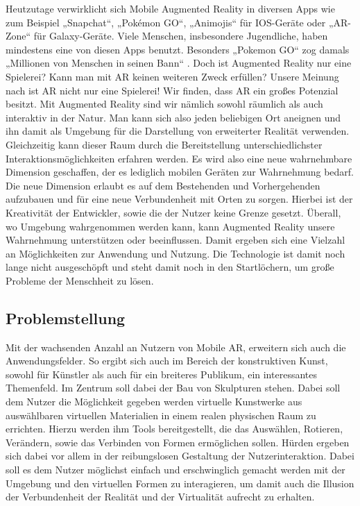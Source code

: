 \documentclass[12pt,a4paper, oneside]{scrartcl}
\begin{document}
	
Heutzutage verwirklicht sich Mobile Augmented Reality in diversen Apps wie zum Beispiel „Snapchat“, „Pokémon GO“, „Animojis“ für IOS-Geräte oder „AR-Zone“ für Galaxy-Geräte. Viele Menschen, insbesondere Jugendliche, haben mindestens eine von diesen Apps benutzt. Besonders „Pokemon GO“ zog damals „Millionen von Menschen in seinen Bann“ \cite{tobien_2016}.  
Doch ist Augmented Reality nur eine Spielerei? Kann man mit AR keinen weiteren Zweck erfüllen?
Unsere Meinung nach ist AR nicht nur eine Spielerei! Wir finden, dass AR ein großes Potenzial besitzt. Mit Augmented Reality sind wir nämlich sowohl räumlich als auch interaktiv in der Natur. Man kann sich also jeden beliebigen Ort aneignen und ihn damit als  Umgebung für die Darstellung von erweiterter Realität verwenden. Gleichzeitig kann dieser Raum durch die Bereitstellung unterschiedlichster Interaktionsmöglichkeiten erfahren werden. Es wird also eine neue wahrnehmbare Dimension geschaffen, der es lediglich mobilen Geräten zur Wahrnehmung bedarf. Die neue Dimension erlaubt es auf dem Bestehenden und Vorhergehenden aufzubauen und für eine neue Verbundenheit mit Orten zu sorgen.
Hierbei ist der Kreativität der Entwickler, sowie die der Nutzer keine Grenze gesetzt. Überall, wo Umgebung wahrgenommen werden kann, kann Augmented Reality unsere Wahrnehmung unterstützen oder beeinflussen.
Damit ergeben sich eine Vielzahl an Möglichkeiten zur Anwendung und Nutzung. Die Technologie ist damit noch lange nicht ausgeschöpft und steht damit noch in den Startlöchern, um große Probleme der Menschheit zu lösen.




\newpage
	
	
	
\subsection{Problemstellung}

Mit der wachsenden Anzahl an Nutzern von Mobile AR, erweitern sich auch die Anwendungsfelder. So ergibt sich auch im Bereich der konstruktiven Kunst, sowohl für Künstler als auch für ein breiteres Publikum, ein interessantes Themenfeld.
Im Zentrum soll dabei der Bau von Skulpturen stehen. Dabei soll dem Nutzer die Möglichkeit gegeben werden virtuelle Kunstwerke aus auswählbaren virtuellen Materialien in einem realen physischen Raum zu errichten. Hierzu werden ihm Tools bereitgestellt, die das Auswählen, Rotieren, Verändern, sowie das Verbinden von Formen ermöglichen sollen. Hürden ergeben sich dabei vor allem in der reibungslosen Gestaltung der Nutzerinteraktion. Dabei soll es dem Nutzer möglichst einfach und erschwinglich gemacht werden mit der Umgebung und den virtuellen Formen zu interagieren, um damit auch die Illusion der Verbundenheit der Realität und der Virtualität aufrecht zu erhalten.
\end{document}
